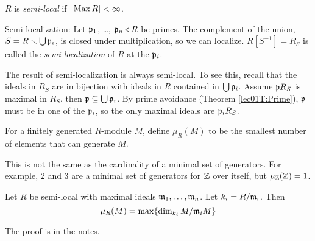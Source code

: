  \begin{definition}
   $R$ is \emph{semi-local} if $|\operatorname{Max} R|<\infty$.
 \end{definition}
 \underline{Semi-localization}: Let $\mathfrak{p}_1$, \dots, $\mathfrak{p}_n\triangleleft R$ be primes. The complement of
 the union, $S=R\smallsetminus \bigcup \mathfrak{p}_i$, is closed under multiplication, so we can
 localize. $R[S^{-1}] = R_S$ is called the \emph{semi-localization}
  of $R$ at the $\mathfrak{p}_i$.

 The result of semi-localization is always semi-local. To see this, recall that the ideals
 in $R_S$ are in bijection with ideals in $R$ contained in $\bigcup \mathfrak{p}_i$. Assume $\mathfrak{p}
 R_S$ is maximal in $R_S$, then $\mathfrak{p}\subseteq \bigcup \mathfrak{p}_i$. By prime avoidance (Theorem
 \ref{lec01T:Prime}), $\mathfrak{p}$ must be in one of the $\mathfrak{p}_i$, so the only maximal ideals are
 $\mathfrak{p}_i R_S$.

 \begin{definition}
   For a finitely generated $R$-module $M$, define $\mu_R(M)$ to be the smallest number
   of elements that can generate $M$.
 \end{definition}
 This is not the same as the cardinality of a minimal set of generators. For example, 2
 and 3 are a minimal set of generators for $\mathbb{Z}$ over itself, but $\mu_{\mathbb{Z}} (\mathbb{Z}) =1$.

 \begin{theorem}
   Let $R$ be semi-local with maximal ideals $\mathfrak{m}_1,\dots, \mathfrak{m}_n$. Let $k_i = R/\mathfrak{m}_i$. Then
   \[
     \mu_R(M) = \max \{\dim_{k_i} M/\mathfrak{m}_i M\}
   \]
 \end{theorem}
 The proof is in the notes. 
